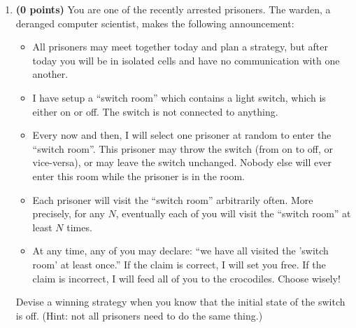 \documentclass[11pt]{article}
\begin{document}
\begin{enumerate}
\item \textbf{(0 points)} You are one of the recently arrested prisoners. The
  warden, a deranged computer scientist, makes the following announcement:
  \begin{itemize}
  \item All prisoners may meet together today and plan a strategy, but after
    today you will be in isolated cells and have no communication with one
    another.
  \item I have setup a ``switch room'' which contains a light switch, which is
    either on or off. The switch is not connected to anything.
  \item Every now and then, I will select one prisoner at random to enter the
    ``switch room''. This prisoner may throw the switch (from on to off, or
    vice-versa), or may leave the switch unchanged. Nobody else will ever enter
    this room while the prisoner is in the room.
  \item Each prisoner will visit the ``switch room'' arbitrarily often. More
    precisely, for any $N$, eventually each of you will visit the ``switch
    room'' at least $N$ times.
  \item At any time, any of you may declare: ``we have all visited the 'switch
    room' at least once.''  If the claim is correct, I will set you free. If the
    claim is incorrect, I will feed all of you to the crocodiles. Choose wisely!
  \end{itemize}

  Devise a winning strategy when you know that the initial state of the switch
  is off. (Hint: not all prisoners need to do the same thing.)

\end{enumerate}
\end{document}
